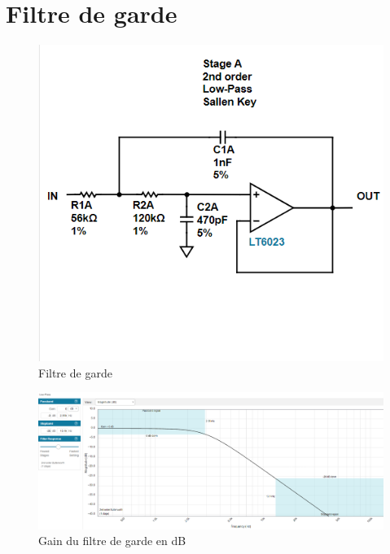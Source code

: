 \section{Filtre de garde}\label{Lowpassfilterannexe}
\begin{figure}[H]
    \centering
    \includegraphics{Pictures/lowpass2.png}
    \caption{Filtre de garde}
    \label{fig:lowpassfilterannexe}
\end{figure}
\newpage
\begin{figure}[H]
    \centering
    \includegraphics[width=1.5\textwidth,angle=90,origin=c]{Pictures/lowpassspecs.png}
    \caption{Gain du filtre de garde en dB}
    \label{fig:lowpassfiltermagnannexe}
\end{figure}

